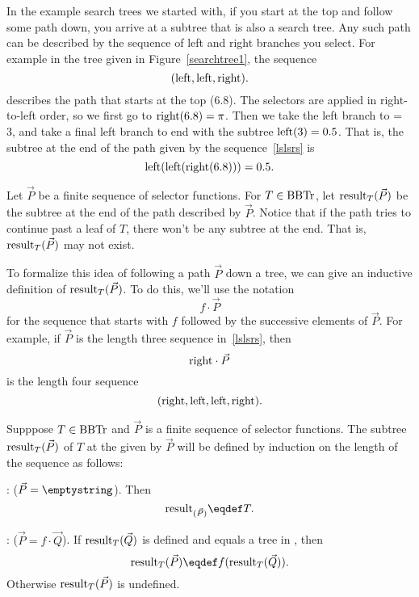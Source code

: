 In the example search trees we started with, if you start at the top
and follow some path down, you arrive at a subtree that is also a
search tree.  Any such path can be described by the sequence of left
and right branches you select.  For example in the tree given in
Figure~\ref{searchtree1}, the sequence
\begin{equation}\label{lslsrs}
(\text{left},\text{left},\text{right}).
\end{equation}
describes the path that starts at the top (6.8).  The selectors are
applied in right-to-left order, so we first go to $\text{right}(6.8) =
\pi$.  Then we take the left branch to \leftsub{(\pi)} = 3, and take a
final left branch to end with the subtree $\text{left}(3) = 0.5$.  That
is, the subtree at the end of the path given by the sequence~\eqref{lslsrs} is
\[
\text{left}(\text{left}(\text{right}(6.8))) = 0.5.
\]

Let $\vec{P}$ be a finite sequence of selector functions.  For $T \in
\text{BBTr}$, let $\text{result}_{T}(\vec{P})$ be the subtree at the end of the
path described by $\vec{P}$.  Notice that if the path tries to
continue past a leaf of $T$, there won't be any subtree at the end.
That is, $\text{result}_{T}(\vec{P})$ may not exist.

To formalize this idea of following a path $\vec{P}$ down a tree, we
can give an inductive definition of $\text{result}_{T}(\vec{P})$.  To do
this, we'll use the notation
\[
f \cdot \vec{P}
\]
for the sequence that starts with $f$ followed by the successive
elements of $\vec{P}$.  For example, if $\vec{P}$ is the length three
sequence in~\eqref{lslsrs}, then
\[
\text{right} \cdot \vec{P}
\]
is the length four sequence
\[
(\text{right}, \text{left},\text{left},\text{right}).
\]

\begin{definition}
Supppose $T \in \text{BBTr}$ and $\vec{P}$ is a finite sequence of selector
functions.  The subtree $\text{result}_{T}(\vec{P} )$ of $T$ at the  given by $\vec{P}$ will be defined by induction on
the length of the sequence as follows:

: ($\vec{P} = \emptystring$).
Then
\[
\rslt{(\vec{P})} \eqdef T.
\]

: ($\vec{P} = f \cdot \vec{Q}$).  If
$\text{result}_{T}(\vec{Q})$ is defined and equals a tree in \brnchng, then
\[
\rslt{T}{(\vec{P})} \eqdef f(\rslt{T}{(\vec{Q})}).
\]
Otherwise $\text{result}_{T}(\vec{P})$ is undefined.
\end{definition}

